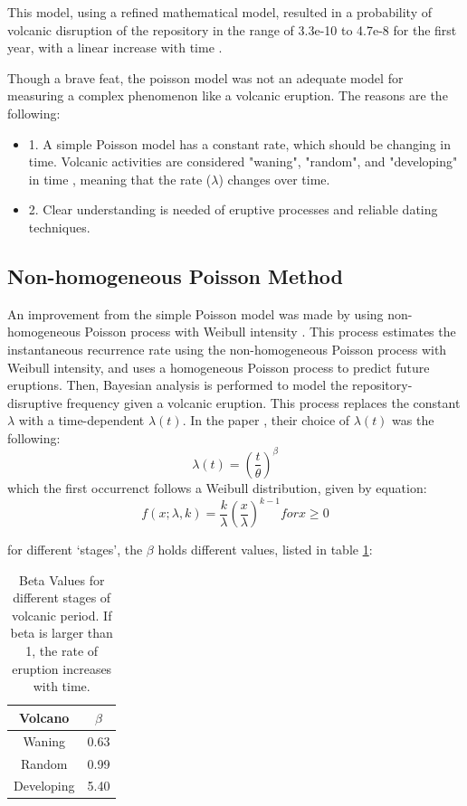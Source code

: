 \documentclass[12pt]{article}
\begin{document}
This model, using a refined mathematical model, resulted in a 
probability of volcanic disruption of the repository in the range of 
3.3e-10 to 4.7e-8 for the first year, with a linear increase with time \cite{crowe_volcanic_1986}.

Though a brave feat, the poisson model was not an adequate model for 
measuring a complex phenomenon like a volcanic eruption. The reasons
are the following:

\begin{itemize}
    \item 1. A simple Poisson model has a constant rate, which should be changing in time. Volcanic
            activities are considered "waning", "random", and "developing" in time \cite{ho_nonhomogeneous_1991}, meaning
            that the rate ($\lambda$) changes over time. 
    \item 2. Clear understanding is needed of eruptive processes and reliable dating techniques.
\end{itemize}


\subsection{Non-homogeneous Poisson Method}
An improvement from the simple Poisson model was made by using
non-homogeneous Poisson process with Weibull intensity \cite{ho_risk_1992}.
This process estimates the instantaneous recurrence rate using the
non-homogeneous Poisson process with Weibull intensity, and uses 
a homogeneous Poisson process to predict future eruptions.
Then, Bayesian analysis is performed to model the repository-disruptive frequency
given a volcanic eruption. This process replaces the constant $\lambda$ with
a time-dependent $\lambda(t)$. In the paper \cite{ho_risk_1992}, their choice of 
$\lambda(t)$ was the following:
\[ \lambda(t) = (\frac{t}{\theta})^{\beta}\]
which the first occurrenct follows a Weibull distribution, given by equation:
\[f(x;\lambda, k) = \frac{k}{\lambda} (\frac{x}{\lambda})^{k-1} for x\geq 0 \]

for different `stages', the $\beta$ holds different values, listed in table \ref{tab:beta}:

\begin{table}[h]
    \centering
        \begin{tabular}{cc}
            \hline
            \textbf{Volcano} & \textbf{$\beta$} \\ \hline
            Waning & 0.63 \\
            Random & 0.99 \\
            Developing & 5.40 \\
            \hline
       \end{tabular}
        \caption{Beta Values for different stages of volcanic period. If beta is larger than
                 1, the rate of eruption increases with time.}
        \label{tab:beta}
\end {table}
\end{document}
